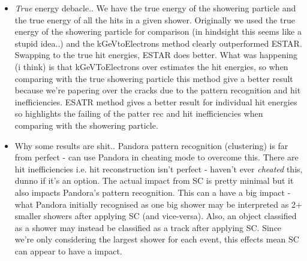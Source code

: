 \begin{itemize}
	\item \textit{True} energy debacle.. We have the true energy of the showering particle and the true energy of all the hits in a given shower. Originally we used the true energy of the showering particle for comparison (in hindsight this seems like a stupid idea..) and the kGeVtoElectrons method clearly outperformed ESTAR. Swapping to the true hit energies, ESTAR does better. What was happening (i think) is that kGeVToElectrons over estimates the hit energies, so when comparing with the true showering particle this method give a better result because we're papering over the cracks due to the pattern recognition and hit inefficiencies. ESATR method gives a better result for individual hit energies so highlights the failing of the patter rec and hit inefficiencies when comparing with the showering particle. 
	\item Why some results are shit.. Pandora pattern recognition (clustering) is far from perfect - can use Pandora in cheating mode to overcome this. There are hit inefficiencies i.e. hit reconstruction isn't perfect - haven't ever \textit{cheated} this, dunno if it's an option. The actual impact from SC is pretty minimal but it also impacts Pandora's pattern recognition. This can a have a big impact - what Pandora initially recognised as one big shower may be interpreted as 2+ smaller showers after applying SC (and vice-versa). Also, an object classified as a shower may instead be classified as a track after applying SC. Since we're only considering the largest shower for each event, this effects mean SC can appear to have a impact. 
\end{itemize}
